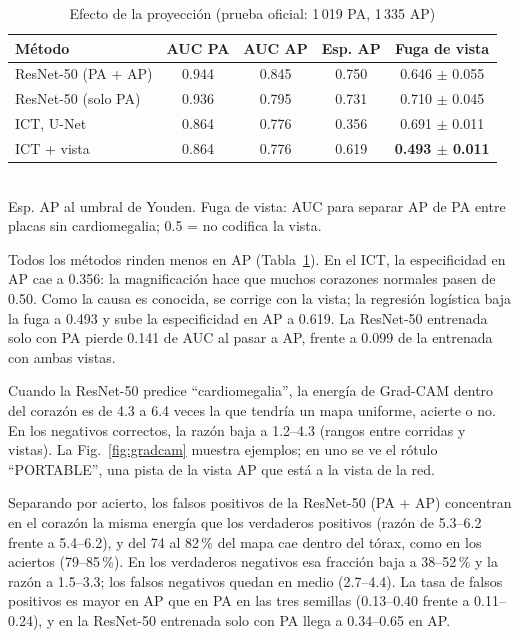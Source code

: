 \documentclass[conference]{IEEEtran}
\begin{document}
\begin{table}[t]
\caption{Efecto de la proyección (prueba oficial: 1\,019 PA, 1\,335 AP)}\label{tab:e4}
\centering
\setlength{\tabcolsep}{4pt}
\begin{tabular}{lcccc}
\toprule
Método & AUC PA & AUC AP & Esp. AP & Fuga de vista \\
\midrule
ResNet-50 (PA + AP) & 0.944 & 0.845 & 0.750 & 0.646 $\pm$ 0.055 \\
ResNet-50 (solo PA) & 0.936 & 0.795 & 0.731 & 0.710 $\pm$ 0.045 \\
ICT, U-Net & 0.864 & 0.776 & 0.356 & 0.691 $\pm$ 0.011 \\
ICT + vista & 0.864 & 0.776 & 0.619 & \textbf{0.493 $\pm$ 0.011} \\
\bottomrule
\end{tabular}
\\[2pt]{\footnotesize Esp. AP al umbral de Youden. Fuga de vista: AUC para separar AP de PA entre placas sin
cardiomegalia; 0.5 = no codifica la vista.}
\end{table}

Todos los métodos rinden menos en AP (Tabla~\ref{tab:e4}). En el ICT, la especificidad en AP cae a 0.356: la
magnificación hace que muchos corazones normales pasen de 0.50. Como la causa es conocida, se corrige con la vista; la
regresión logística baja la fuga a 0.493 y sube la especificidad en AP a 0.619. La ResNet-50 entrenada solo con PA
pierde 0.141 de AUC al pasar a AP, frente a 0.099 de la entrenada con ambas vistas.

Cuando la ResNet-50 predice ``cardiomegalia'', la energía de Grad-CAM dentro del corazón es de 4.3 a 6.4 veces la que
tendría un mapa uniforme, acierte o no. En los negativos correctos, la razón baja a 1.2--4.3 (rangos entre corridas y
vistas). La Fig.~\ref{fig:gradcam} muestra ejemplos; en uno se ve el rótulo ``PORTABLE'', una pista de la vista AP
que está a la vista de la red.

Separando por acierto, los falsos positivos de la ResNet-50 (PA + AP) concentran en el corazón la misma energía que
los verdaderos positivos (razón de 5.3--6.2 frente a 5.4--6.2), y del 74 al 82\,\% del mapa cae dentro del tórax,
como en los aciertos (79--85\,\%). En los verdaderos negativos esa fracción baja a 38--52\,\% y la razón a 1.5--3.3;
los falsos negativos quedan en medio (2.7--4.4). La tasa de falsos positivos es mayor en AP que en PA en las tres
semillas (0.13--0.40 frente a 0.11--0.24), y en la ResNet-50 entrenada solo con PA llega a 0.34--0.65 en AP.
\end{document}
